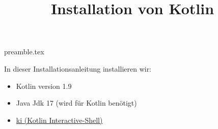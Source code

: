 \RequirePackage{import}
{preamble.tex}
\usepackage{hyperref}
\title{Installation von Kotlin}


\maketitle


In dieser Installationsanleitung installieren wir:
\begin{itemize}
    \item Kotlin version 1.9
    \item Java Jdk 17 (wird für Kotlin benötigt)
    \item \href{https://github.com/Kotlin/kotlin-interactive-shell}{ki (\underline{K}otlin \underline{I}nteractive-Shell)}
\end{itemize}
